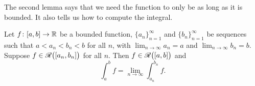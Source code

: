 The second lemma says that we need the function to only be  as long as it is bounded.  It also tells us how to
compute the integral.

\begin{lemma} \label{lemma:boundedimpriemann}
Let $f \colon [a,b] \to {\mathbb{R}}$ be a bounded function,
$\{ a_n \}_{n=1}^\infty$ and $\{b_n \}_{n=1}^\infty$ be sequences such that
$a < a_n < b_n < b$ for all $n$, with
$\lim_{n\to\infty} a_n = a$ and $\lim_{n\to\infty} b_n = b$.
Suppose $f \in {\mathscr{R}}\bigl([a_n,b_n]\bigr)$ for all $n$.
Then $f \in {\mathscr{R}}\bigl([a,b]\bigr)$ and
\begin{equation*}
\int_a^b f = 
\lim_{n \to \infty} \int_{a_n}^{b_n} f .
\end{equation*}
\end{lemma}

